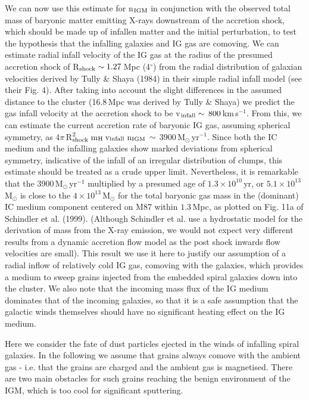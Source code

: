 \documentclass[]{aa}
\begin{document}
We can now use this estimate for n$_{\rm IGM}$ 
in conjunction with the observed total
mass of baryonic matter emitting X-rays downstream of the accretion shock,
which should be made up of infallen matter and the initial perturbation, to
test the hypothesis that the infalling galaxies and IG gas are comoving.
We can estimate radial infall velocity of the IG gas at the radius of 
the presumed accretion shock of R$_{\rm shock}\sim1.27$\,Mpc (4$^{\circ}$) 
from the radial distribution of galaxian velocities derived by 
Tully \& Shaya (1984) in their simple radial infall model (see their Fig. 4). 
After taking into account the slight 
differences in the assumed distance to the cluster (16.8$\,$Mpc was derived 
by Tully \& Shaya) we predict the gas infall velocity at the accretion shock 
to be v$_{\rm infall}\sim\,800\,$km$\,$s$^{-1}$. From this, we can estimate the
current accretion rate of baryonic IG gas, assuming spherical symmetry, as
$4\pi\,$R$_{\rm shock}^{2}\,$m$_{\rm H}\,$v$_{\rm infall}\,$n$_{\rm IGM}\,
\sim$ \newline$3900\,$M$_{\odot}\,$yr$^{-1}$. Since both the IC medium and the infalling
galaxies show marked deviations from spherical symmetry, indicative of the
infall of an irregular distribution of clumps, this estimate should be treated
as a crude upper limit. Nevertheless, it is remarkable that the
3900\,M$_{\odot}\,$yr$^{-1}$ multiplied by a presumed age of 
$1.3\times10^{10}\,$yr, or $5.1\times10^{13}\,$M$_{\odot}$ is
close to the $4\times10^{13}\,$M$_{\odot}$ for the total baryonic
gas mass in the (dominant) IC medium component centered on M87 within
$1.3\,$Mpc, as plotted on Fig. 11a of Schindler et al. 
(1999). (Although
Schindler et al. use a hydrostatic model for the derivation of mass from
the X-ray emission, we would not expect very different results from a 
dynamic accretion flow model as the post shock inwards flow velocities 
are small). This result we use it here to justify our assumption of
a radial inflow of relatively cold IG gas, comoving
with the galaxies, which provides a medium to sweep
grains injected from the embedded spiral galaxies down into the cluster.
We also note that the incoming mass flux of the IG medium dominates that of the
incoming galaxies, so that it is a safe assumption that the
galactic winds themselves should have no significant heating
effect on the IG medium. 

Here we consider the fate of dust particles ejected in the winds of infalling
spiral galaxies. In the following we assume that grains always comove with the
ambient gas - i.e. that the grains are charged and the ambient gas is
magnetised. There are two main obstacles for such grains reaching the benign
environment of the IGM, which is too cool for significant sputtering. 
\end{document}
